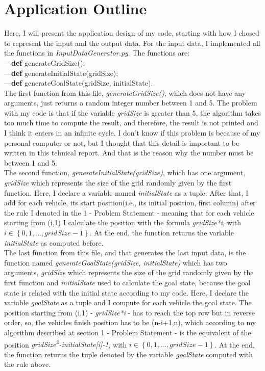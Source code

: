 \documentclass[14pt]{article}
\begin{document}
\section{Application Outline}
Here, I will present the application design of my code, starting with how I chosed to represent the input and the output data. For the input data, I implemented all the functions in \textit{InputDataGenerator.py}. The functions are:
\\---\textbf{def} generateGridSize();
\\---\textbf{def} generateInitialState(gridSize);
\\---\textbf{def} generateGoalState(gridSize, initialState).
\vspace{2.5 mm}
\\The first function from this file, \textit{generateGridSize()}, which does not have any arguments, just returns a random integer number between 1 and 5. The problem with my code is that if the variable \textit{gridSize} is greater than 5, the algorithm takes too much time to compute the result, and therefore, the result is not printed and I think it enters in an infinite cycle. I don't know if this problem is because of my personal computer or not, but I thought that this detail is important to be written in this tehnical report. And that is the reason why the number must be between 1 and 5.
\vspace{2.5 mm}
\\The second function, \textit{generateInitialState(gridSize)}, which has one argument, \textit{gridSize} which represents the size of the grid randomly given by the first function. Here, I declare a variable named \textit{initialState} as a tuple. After that, I add for each vehicle, its start position(i.e., its initial position, first column) after the rule I denoted in the 1 - Problem Statement - meaning that for each vehicle starting from (i,1) I calculate the position with the formula \textit{gridSize*i}, with $i \in \left \{0, 1, ..., gridSize-1\right \}$. At the end, the function returns the variable \textit{initialState} as computed before.
\vspace{2.5 mm}
\\The last function from this file, and that generates the last input data, is the function named \textit{generateGoalState(gridSize, initialState)} which has two arguments, \textit{gridSize} which represents the size of the grid randomly given by the first function and \textit{initialState} used to calculate the goal state, because the goal state is related with the initial state according to my code. Here, I declare the variable \textit{goalState} as a tuple and I compute for each vehicle the goal state. The position starting from (i,1) - \textit{gridSize*i} - has to reach the top row but in reverse order, so, the vehicles finish position has to be (n-i+1,n), which according to my algorithm described at section 1 - Problem Statement - is the equivalent of the position \textit{gridSize\textsuperscript{2}-initialState[i]-1}, with $i \in \left \{0, 1, ..., gridSize-1\right \}$. At the end, the function returns the tuple denoted by the variable \textit{goalState} computed with the rule above.
\end{document}

